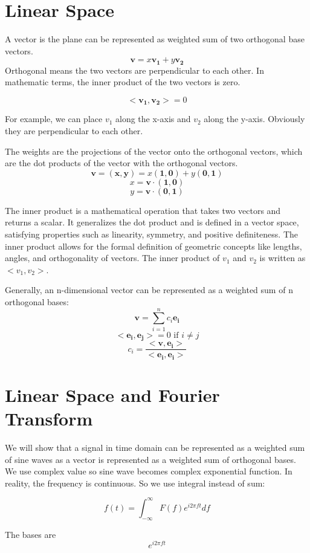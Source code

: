 \section{Linear Space}
A vector is the plane can be represented as weighted sum of two
orthogonal base vectors.
\[
\mathbf{v} = x\mathbf{v_1} + y\mathbf{v_2}
\]
Orthogonal means the two vectors are perpendicular to each other. In mathematic
terms, the inner product of the two vectors is zero.

\[
<\mathbf{v_1} ,\mathbf{v_2}> = 0
\]

For example, we can place \(v_1\) along the x-axis and \(v_2\) along the y-axis. Obviously
they are perpendicular to each other.

The weights are the projections of the vector onto the orthogonal vectors,
which are the dot products of the vector with the orthogonal vectors.
\[
\mathbf{v} = \mathbf{(x,y)} = x\mathbf{(1,0)} + y\mathbf{(0,1)}
\]
\[
x = \mathbf{v} \cdot \mathbf{(1,0)}
\]
\[
y = \mathbf{v} \cdot \mathbf{(0,1)}
\]

The inner product is a mathematical operation that takes two vectors and returns a scalar.
It generalizes the dot product and is defined in a vector space, satisfying properties such as linearity, symmetry, and positive definiteness. The inner product allows for the formal definition of geometric concepts like lengths, angles, and orthogonality of vectors.
The inner product of \(v_1\) and \(v_2\) is written as \(<v_1, v_2>\).

Generally, an n-dimensional vector can be represented as a weighted sum of n orthogonal bases:
\[
\mathbf{v} = \sum_{i=1}^n c_i \mathbf{e_i}
\]
\[
<\mathbf{e_i}, \mathbf{e_j}> = 0 \text{ if } i \neq j
\]
\[
c_i = \frac{<\mathbf{v}, \mathbf{e_i}>}{<\mathbf{e_i}, \mathbf{e_i}>}
\]

\section{Linear Space and Fourier Transform}
We will show that a signal in time domain can be represented as a weighted sum of sine waves
as a vector is represented as a weighted sum of orthogonal bases.
We use complex value so sine wave becomes complex exponential function.
In reality, the frequency is continuous. So we use integral instead of sum:

\[
f(t) = \int_{-\infty}^{\infty} F(f) e^{i2\pi f t} df
\]

The bases are
\[
e^{i2\pi f t}
\]

